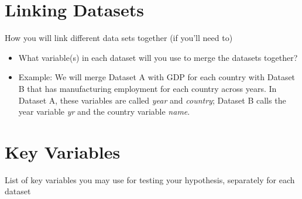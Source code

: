 \documentclass[12pt]{article}
\begin{document}
\section{Linking Datasets}
\label{sec:discussion}

How you will link different data sets together (if you'll need to)
\begin{itemize}
    \item What variable(s) in each dataset will you use to merge the datasets together?
    \item Example: We will merge Dataset A with GDP for each country with Dataset B that has manufacturing employment for each country across years. In Dataset A, these variables are called \textit{year} and \emph{country}; Dataset B calls the year variable \emph{yr} and the country variable \emph{name}.
\end{itemize}


\section{Key Variables}
\label{sec:result}

List of key variables you may use for testing your hypothesis, separately for each dataset
\end{document}
